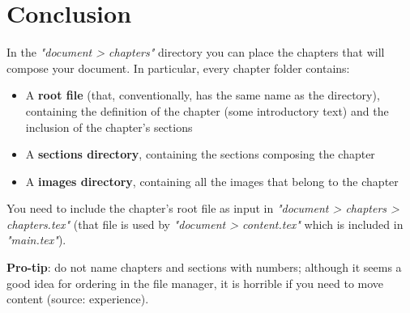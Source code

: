 \chapter{Conclusion}\label{conclusion}
In the \textit{"document > chapters"} directory you can place the chapters that will compose your document.
In particular, every chapter folder contains:
\begin{itemize}
    \item A \textbf{root file} (that, conventionally, has the same name as the directory), containing the definition of the chapter (some introductory text) and the inclusion of the chapter's sections
    \item A \textbf{sections directory}, containing the sections composing the chapter
    \item A \textbf{images directory}, containing all the images that belong to the chapter
\end{itemize}

You need to include the chapter's root file as input in \textit{"document > chapters > chapters.tex"} (that file is used by \textit{"document > content.tex"} which is included in \textit{"main.tex"}).

\textbf{Pro-tip}: do not name chapters and sections with numbers; although it seems a good idea for ordering in the file manager, it is horrible if you need to move content (source: experience).
